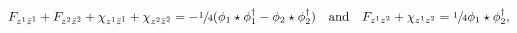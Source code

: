 \begin{equation}
  F_{z^1\bar{z}^{\bar{1}}}+ 
  F_{z^2\bar{z}^{\bar{2}}}+
  \chi_{z^1\bar{z}^{\bar{1}}}+\chi_{z^2\bar{z}^{\bar{2}}}
 =-\sfrac{1}{4}
 (\phi_1\star\phi_1^\dagger-\phi_2\star\phi_2^\dagger) 
 \quad \text{and} \quad  F_{z^1z^2}+\chi_{z^1z^2}=
  \sfrac{1}{4}\phi_1\star\phi_2^\dagger,
\end{equation}

